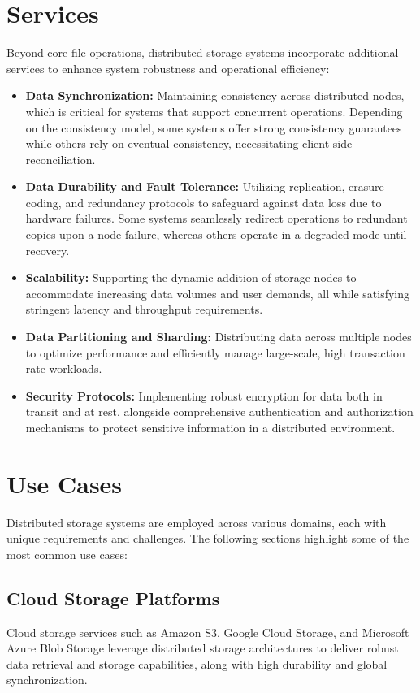 \section{Services}
Beyond core file operations, distributed storage systems incorporate additional services to enhance system robustness and operational efficiency:
\begin{itemize}
    \item \textbf{Data Synchronization:} Maintaining consistency across distributed nodes, which is critical for systems that support concurrent operations. Depending on the consistency model, some systems offer strong consistency guarantees while others rely on eventual consistency, necessitating client-side reconciliation.
    \item \textbf{Data Durability and Fault Tolerance:} Utilizing replication, erasure coding, and redundancy protocols to safeguard against data loss due to hardware failures. Some systems seamlessly redirect operations to redundant copies upon a node failure, whereas others operate in a degraded mode until recovery.
    \item \textbf{Scalability:} Supporting the dynamic addition of storage nodes to accommodate increasing data volumes and user demands, all while satisfying stringent latency and throughput requirements.
    \item \textbf{Data Partitioning and Sharding:} Distributing data across multiple nodes to optimize performance and efficiently manage large-scale, high transaction rate workloads.
    \item \textbf{Security Protocols:} Implementing robust encryption for data both in transit and at rest, alongside comprehensive authentication and authorization mechanisms to protect sensitive information in a distributed environment.
\end{itemize}

\section{Use Cases}
Distributed storage systems are employed across various domains, each with unique requirements and challenges. The following sections highlight some of the most common use cases:

\subsection{Cloud Storage Platforms}
Cloud storage services such as Amazon S3\cite{amazon_s3}, Google Cloud Storage\cite{google_cloud_storage}, and Microsoft Azure\cite{azure} Blob Storage leverage distributed storage architectures to deliver robust data retrieval and storage capabilities, along with high durability and global synchronization.

